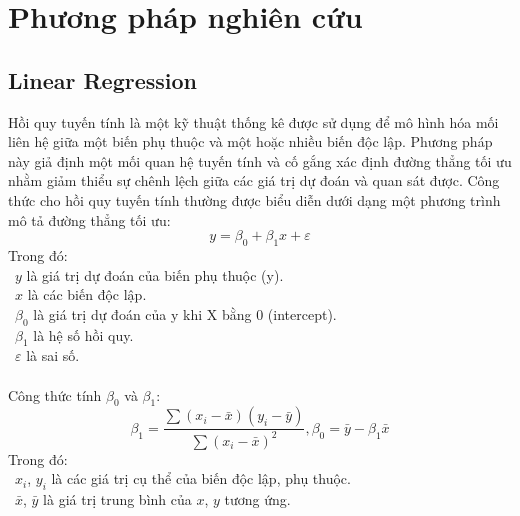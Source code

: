 \section{Phương pháp nghiên cứu}
\subsection{Linear Regression}
Hồi quy tuyến tính là một kỹ thuật thống kê được sử dụng để mô hình hóa mối liên hệ giữa một biến phụ thuộc và một hoặc nhiều biến độc lập. Phương pháp này giả định một mối quan hệ tuyến tính và cố gắng xác định đường thẳng tối ưu nhằm giảm thiểu sự chênh lệch giữa các giá trị dự đoán và quan sát được. Công thức cho hồi quy tuyến tính thường được biểu diễn dưới dạng một phương trình mô tả đường thẳng tối ưu:
\[y=\beta_0+\beta_1x+\varepsilon\]
Trong đó:\\
	\indent\textbullet\ \(y\) là giá trị dự đoán của biến phụ thuộc (y).\\
	\indent\textbullet\ \(x\) là các biến độc lập.\\
	\indent\textbullet\ \(\beta_0\) là giá trị dự đoán của y khi X bằng 0 (intercept).\\
	\indent\textbullet\ \(\beta_1\) là hệ số hồi quy.\\
	\indent\textbullet\ \(\varepsilon\) là sai số.\\
\\Công thức tính \(\beta_0\) và \(\beta_1\):\\
\[\beta_1=\frac{\sum\left(x_i-\bar{x}\right)\left(y_i-\bar{y}\right)}{\sum\left(x_i-\bar{x}\right)^2}, \beta_0=\bar{y}-\beta_1\bar{x}\]
Trong đó:\\
	\indent\textbullet\ \(x_i\), \(y_i\) là các giá trị cụ thể của biến độc lập, phụ thuộc.\\
	\indent\textbullet\ \(\bar{x}\), \(\bar{y}\) là giá trị trung bình của \(x\), \(y\) tương ứng.\\

